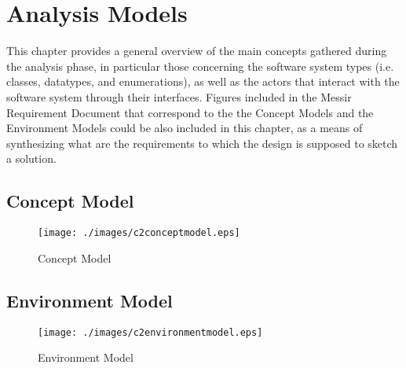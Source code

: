 \chapter{Analysis Models}
\label{chap:AM}

This chapter provides a general overview of the main concepts gathered during
the analysis phase, in particular those concerning the software system types
(i.e. classes, datatypes, and enumerations), as well as the actors that interact
with the software system through their interfaces. Figures included in the
Messir Requirement Document that correspond to the  the \glspl{Concept Model} and the \glspl{Environment
Model} could be also included in this chapter, as a means of synthesizing what
are the requirements to which the design is supposed to sketch a solution.

\section{Concept Model}
\begin{figure}[ht]
\begin{center}
\texttt{[image: ./images/c2conceptmodel.eps]}
\end{center}
\caption{Concept Model}
\label{fig:Fig.1}
\end{figure} 
   
\newpage   

\section{Environment Model}
\begin{figure}[ht]
	\begin{center}
		\texttt{[image: ./images/c2environmentmodel.eps]}
	\end{center}
	\caption{Environment Model}
	\label{fig:Fig.2}
\end{figure} 

